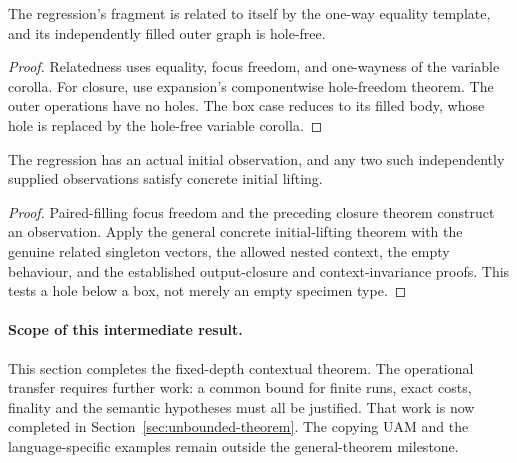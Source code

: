 \begin{lemma}
The regression's fragment is related to itself by the one-way equality template, and its independently filled outer graph is hole-free.
\end{lemma}
\begin{proof}
Relatedness uses equality, focus freedom, and one-wayness of the variable corolla. For closure, use expansion's componentwise hole-freedom theorem. The outer operations have no holes. The box case reduces to its filled body, whose hole is replaced by the hole-free variable corolla.
\end{proof}

\begin{lemma}
The regression has an actual initial observation, and any two such independently supplied observations satisfy concrete initial lifting.
\end{lemma}
\begin{proof}
Paired-filling focus freedom and the preceding closure theorem construct an observation. Apply the general concrete initial-lifting theorem with the genuine related singleton vectors, the allowed nested context, the empty behaviour, and the established output-closure and context-invariance proofs. This tests a hole below a box, not merely an empty specimen type.
\end{proof}

\paragraph{Scope of this intermediate result.}
This section completes the fixed-depth contextual theorem. The operational
transfer requires further work: a common bound for finite runs, exact costs,
finality and the semantic hypotheses must all be justified. That work is now
completed in Section~\ref{sec:unbounded-theorem}. The copying UAM and the
language-specific examples remain outside the general-theorem milestone.

